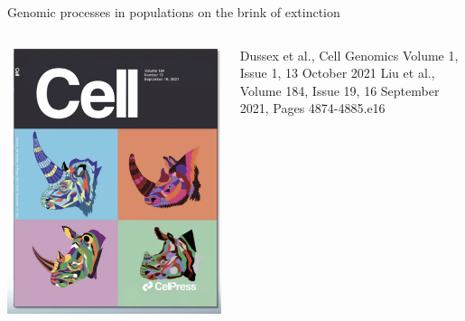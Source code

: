 \documentclass[10pt]{beamer}
\newcommand{\credit}[1]{{\vspace{\fill} \par \raggedleft \scriptsize \mdseries \color{mDarkBrown} #1 \par}}
\begin{document}
\begin{frame}{Genomic processes in populations on the brink of extinction}
\begin{columns}
\begin{column}{0.7\textwidth}
\begin{center}
		\end{center}
	\end{column}
\end{columns}
\begin{columns}
	\begin{column}{0.3\textwidth}
		\begin{center}
			\includegraphics[width=\textwidth]{./figures/rhinoceros-crop.png}
		\end{center}
	\end{column}
	\begin{column}{0.7\textwidth}
		\begin{center}
			\credit{Dussex et al., Cell Genomics Volume 1, Issue 1, 13 October 2021 \linebreak Liu et al., Volume 184, Issue 19, 16 September 2021, Pages 4874-4885.e16}
		\end{center}
	\end{column}
\end{columns}    
\end{frame}
\end{document}
